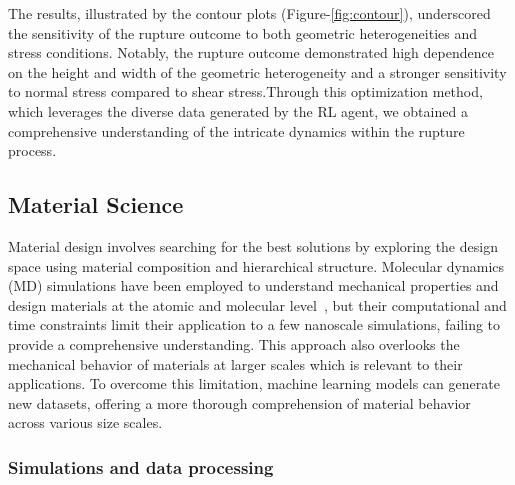\documentclass{article}
\begin{document}
The results, illustrated by the contour plots (Figure-\ref{fig:contour}), underscored the sensitivity of the rupture outcome to both geometric heterogeneities and stress conditions. Notably, the rupture outcome demonstrated high dependence on the height and width of the geometric heterogeneity and a stronger sensitivity to normal stress compared to shear stress.Through this optimization method, which leverages the diverse data generated by the RL agent, we obtained a comprehensive understanding of the intricate dynamics within the rupture process.


\subsection{Material Science}
Material design involves searching for the best solutions by exploring the design space using
material composition and hierarchical structure. Molecular dynamics (MD) simulations have been
employed to understand mechanical properties and design materials at the atomic and molecular level~\citep{uddin2023finite, uddin2020studying, uddinstudy,mesbah2023study}, but
their computational and time constraints limit their application to a few nanoscale simulations, failing to
provide a comprehensive understanding. This approach also overlooks the mechanical behavior of
materials at larger scales which is relevant to their applications. To overcome this limitation, machine
learning models can generate new datasets, offering a more thorough comprehension of material behavior
across various size scales.

\subsubsection{Simulations and data processing}
\end{document}
